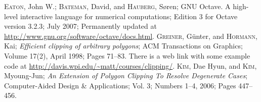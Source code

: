\documentclass[10pt,a4paper]{article}
\begin{document}
%
%
%
%
%
%
%
%
%

\begin{thebibliography}{99}
 \textsc{Eaton}, John W.; \textsc{Bateman}, David, and
                 \textsc{Hauberg}, S\o{}ren; GNU Octave. A high-level
                 interactive language for numerical computations; Edition 3 for
                 Octave version 3.2.3; July 2007; Permanently updated at
                 \url{http://www.gnu.org/software/octave/docs.html}.
 \textsc{Greiner}, G\"unter, and \textsc{Hormann}, Kai;
                      \textit{Efficient clipping of arbitrary polygons};
                      ACM Transactions on Graphics; Volume 17(2), April 1998;
                      Pages 71--83.
                      There is a web link with some example code at
                      \url{http://davis.wpi.edu/~matt/courses/clipping/}.
 \textsc{Kim}, Dae Hyun, and \textsc{Kim}, Myoung-Jun;
                   \textit{An Extension of Polygon Clipping To Resolve
                           Degenerate Cases};
                   Computer-Aided Design \& Applications; Vol. 3; Numbers 1--4,
                   2006; Pages 447--456.
\end{thebibliography}
\end{document}
